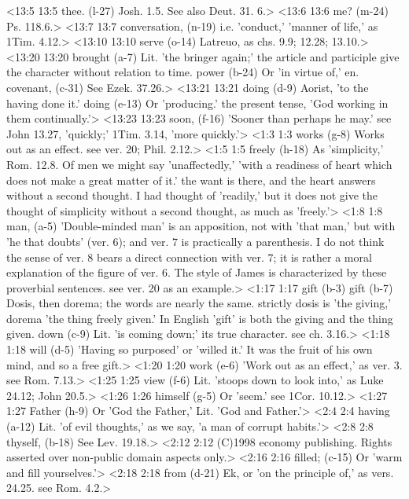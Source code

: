 <13:5 13:5  thee. (l-27)  Josh. 1.5. See also Deut. 31. 6.>
<13:6 13:6  me? (m-24)  Ps. 118.6.>
<13:7 13:7  conversation, (n-19)  i.e. 'conduct,' 'manner of life,' as 1Tim. 4.12.>
<13:10 13:10  serve (o-14)  Latreuo, as chs. 9.9; 12.28; 13.10.>
<13:20 13:20  brought (a-7)  Lit. 'the bringer again;' the article and participle give the  character without relation to time.
  power (b-24)  Or 'in virtue of,' en.
  covenant, (c-31)  See Ezek. 37.26.>
<13:21 13:21  doing (d-9)  Aorist, 'to the having done it.'
  doing (e-13)  Or 'producing.' the present tense, 'God working in them  continually.'>
<13:23 13:23  soon, (f-16)  'Sooner than perhaps he may.' see John 13.27, 'quickly;' 1Tim. 3.14, 'more quickly.'>
<1:3 1:3  works (g-8)  Works out as an effect. see ver. 20; Phil. 2.12.>
<1:5 1:5  freely (h-18)  As 'simplicity,' Rom. 12.8. Of men we might say  'unaffectedly,' 'with a readiness of heart which does not make  a great matter of it.' the want is there, and the heart answers  without a second thought. I had thought of 'readily,' but it  does not give the thought of simplicity without a second  thought, as much as 'freely.'>
<1:8 1:8  man, (a-5)  'Double-minded man' is an apposition, not with 'that man,'  but with 'he that doubts' (ver. 6); and ver. 7 is practically a  parenthesis. I do not think the sense of ver. 8 bears a direct  connection with ver. 7; it is rather a moral explanation of the  figure of ver. 6. The style of James is characterized by these  proverbial sentences. see ver. 20 as an example.>
<1:17 1:17  gift (b-3)  gift (b-7)
  Dosis, then dorema; the words are nearly the same.  strictly dosis is 'the giving,' dorema 'the thing freely  given.' In English 'gift' is both the giving and the thing  given.
  down (c-9)  Lit. 'is coming down;' its true character. see ch. 3.16.>
<1:18 1:18  will (d-5)  'Having so purposed' or 'willed it.' It was the fruit of his  own mind, and so a free gift.>
<1:20 1:20  work (e-6)  'Work out as an effect,' as ver. 3. see Rom. 7.13.>
<1:25 1:25  view (f-6)  Lit. 'stoops down to look into,' as Luke 24.12; John 20.5.>
<1:26 1:26  himself (g-5)  Or 'seem.' see 1Cor. 10.12.>
<1:27 1:27  Father (h-9)  Or 'God the Father,' Lit. 'God and Father.'>
<2:4 2:4  having (a-12)  Lit. 'of evil thoughts,' as we say, 'a man of corrupt  habits.'>
<2:8 2:8  thyself, (b-18)  See Lev. 19.18.>
<2:12 2:12
 (C)1998 economy publishing.  Rights asserted over non-public domain aspects only.>
<2:16 2:16  filled; (c-15)  Or 'warm and fill yourselves.'>
<2:18 2:18  from (d-21)  Ek, or 'on the principle of,' as vers. 24.25. see Rom. 4.2.>
